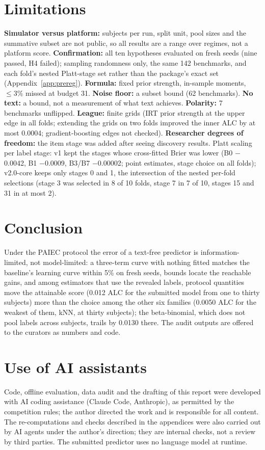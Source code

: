 \documentclass{article}
\begin{document}
\section{Limitations}
\label{sec:limits}

\textbf{Simulator versus platform:} subjects per run, split unit, pool sizes and the summative subset are not public,
so all results are a range over regimes, not a platform score. \textbf{Confirmation:} all ten hypotheses evaluated on
fresh seeds (nine passed, H4 failed); sampling randomness only, the same 142 benchmarks, and each fold's nested
Platt-stage set rather than the package's exact set (Appendix~\ref{app:prereg}). \textbf{Formula:} fixed prior strength, in-sample moments, $\le 3\%$ missed at budget 31.
\textbf{Noise floor:} a subset bound (62 benchmarks). \textbf{No text:} a bound, not a measurement of what text achieves.
\textbf{Polarity:} 7 benchmarks unflipped. \textbf{League:} finite grids (IRT prior strength at the upper edge in all
folds; extending the grids on two folds improved the inner ALC by at most 0.0004; gradient-boosting edges not checked).
\textbf{Researcher degrees of freedom:} the item stage was added after seeing discovery results.
Platt scaling per label stage: v1 kept the stages whose cross-fitted Brier was lower (B0 $-$0.0042, B1 $-$0.0009, B3/B7
$-$0.00002; point estimates, stage choice on all folds); v2.0-core keeps only stages 0 and 1, the intersection of the
nested per-fold selections (stage 3 was selected in 8 of 10 folds, stage 7 in 7 of 10, stages 15 and 31 in at most 2).

\section{Conclusion}
\label{sec:conclusion}

Under the PAIEC protocol the error of a text-free predictor is information-limited, not model-limited: a three-term
curve with nothing fitted matches the baseline's learning curve within 5\% on fresh seeds, bounds locate the reachable
gains, and among estimators that use the revealed labels, protocol quantities move the attainable score (0.012 ALC for the submitted model from one to thirty subjects) more than the choice among the other six families (0.0050 ALC for the weakest of them, kNN, at thirty subjects); the beta-binomial, which does not pool labels across subjects, trails by 0.0130 there. The
audit outputs are offered to the curators as numbers and code.

\section*{Use of AI assistants}
Code, offline evaluation, data audit and the drafting of this report were developed with AI coding assistance (Claude
Code, Anthropic), as permitted by the competition rules; the author directed the work and is responsible for all
content. The re-computations and checks described in the appendices were also carried out by
AI agents under the author's direction; they are internal checks, not a review by third parties. The submitted
predictor uses no language model at runtime.
\end{document}
